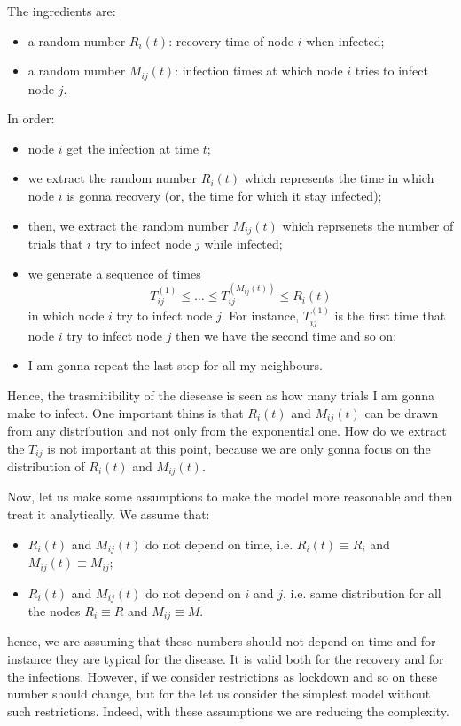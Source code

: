 \documentclass[../main/main.tex]{subfiles}
\begin{document}
The ingredients are:
\begin{itemize}
\item a random number \( R_i (t) \): recovery time of node \( i \) when infected;
\item a random number \( M_{ij} (t) \): infection times at which node \( i \) tries to infect node \( j \).
\end{itemize}
In order:
\begin{itemize}
\item node \( i \) get the infection at time \( t \);
\item we extract the random number \( R_i (t) \) which represents the time in which node \( i \) is gonna recovery (or, the time for which it stay infected);
\item then, we extract the random number  \( M_{ij} (t) \) which reprsenets the number of trials that \( i \) try to infect node \( j \) while infected;
\item we generate a sequence of times
\begin{equation*}
  T_{ij}^{(1)} \le \dots \le T_{ij}^{(M_{ij}(t))} \le R_i (t)
\end{equation*}
in which node \( i \) try to infect node \( j \). For instance, \(  T_{ij}^{(1)} \) is the first time that node \( i \) try to infect node \( j \) then we have the second time and so on;
\item I am gonna repeat the last step for all my neighbours.
\end{itemize}
Hence, the trasmitibility of the diesease is seen as how many trials I am gonna make to infect.
One important thins is that \( R_i (t) \) and \( M_{ij} (t) \) can be drawn from any distribution and not only from the exponential one.
How do we extract the \( T_{ij} \) is not important at this point, because we are only gonna focus on the distribution of \( R_i (t) \) and \( M_{ij} (t) \).


Now, let us make some assumptions to make the model more reasonable and then treat it analytically. We assume that:
\begin{itemize}
\item \( R_i (t) \) and \( M_{ij} (t) \) do not depend on time, i.e. \( R_i (t) \equiv R_i \) and \( M_{ij} (t)  \equiv M_{ij} \);
\item \( R_i (t) \) and \( M_{ij} (t) \)  do not depend on \( i \) and \( j \), i.e. same distribution for all the nodes \( R_i \equiv R \) and \( M_{ij} \equiv M \).
\end{itemize}
hence, we are assuming that these numbers should not depend on time and for instance they are typical for the disease. It is valid both for the recovery and for the infections. However, if we consider restrictions as lockdown and so on these number should change, but for the let us consider the simplest model without such restrictions. Indeed, with these assumptions we are reducing the complexity.
\end{document}
